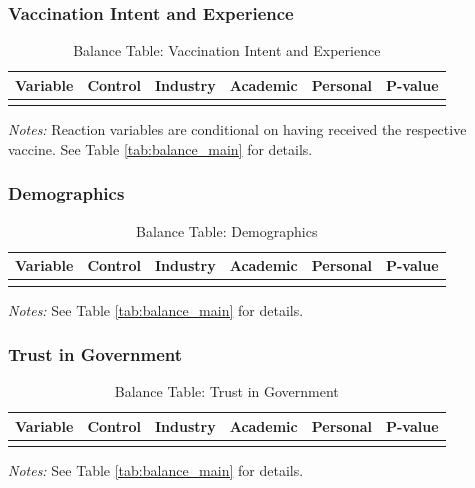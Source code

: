 \documentclass[11pt]{article}
\begin{document}
\subsubsection{Vaccination Intent and Experience}

\begin{table}[H]
\caption{Balance Table: Vaccination Intent and Experience}
\label{tab:balance_vacc}
\centering
\begin{tabular}{lccccc}
\toprule
Variable & Control & Industry & Academic & Personal & P-value \\
\midrule

\\
\bottomrule
\end{tabular}
\begin{minipage}{\textwidth}
\vspace{0.5em}
\footnotesize
\textit{Notes:} Reaction variables are conditional on having received the respective vaccine. See Table \ref{tab:balance_main} for details.
\end{minipage}
\end{table}


\newpage
\subsubsection{Demographics}

\begin{landscape}
\begin{table}[H]
\caption{Balance Table: Demographics}
\label{tab:balance_demographics}
\centering
\small
\begin{tabular}{lccccc}
\toprule
Variable & Control & Industry & Academic & Personal & P-value \\
\midrule

\\
\bottomrule
\end{tabular}
\begin{minipage}{\linewidth}
\vspace{0.5em}
\footnotesize
\textit{Notes:} See Table \ref{tab:balance_main} for details.
\end{minipage}
\end{table}
\end{landscape}


\subsubsection{Trust in Government}

\begin{table}[H]
\caption{Balance Table: Trust in Government}
\label{tab:balance_trust}
\centering
\begin{tabular}{lccccc}
\toprule
Variable & Control & Industry & Academic & Personal & P-value \\
\midrule

\\
\bottomrule
\end{tabular}
\begin{minipage}{\textwidth}
\vspace{0.5em}
\footnotesize
\textit{Notes:} See Table \ref{tab:balance_main} for details.
\end{minipage}
\end{table}
\end{document}
